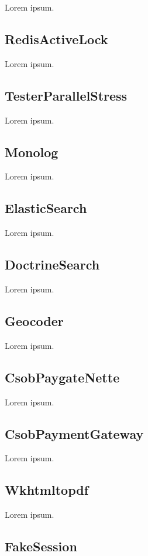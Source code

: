 Lorem ipsum.

\subsection{RedisActiveLock}

Lorem ipsum.

\subsection{TesterParallelStress}

Lorem ipsum.

\subsection{Monolog}

Lorem ipsum.

\subsection{ElasticSearch}

Lorem ipsum.

\subsection{DoctrineSearch}

Lorem ipsum.

\subsection{Geocoder}

Lorem ipsum.

\subsection{CsobPaygateNette}

Lorem ipsum.

\subsection{CsobPaymentGateway}

Lorem ipsum.

\subsection{Wkhtmltopdf}

Lorem ipsum.

\subsection{FakeSession}

